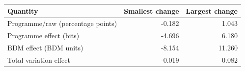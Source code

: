 \begin{tabular}{lrr}
\toprule
Quantity & Smallest change & Largest change \\
\midrule
Programme/raw (percentage points) & -0.182 & 1.043 \\
Programme effect (bits) & -4.696 & 6.180 \\
BDM effect (BDM units) & -8.154 & 11.260 \\
Total variation effect & -0.019 & 0.082 \\
\bottomrule
\end{tabular}
